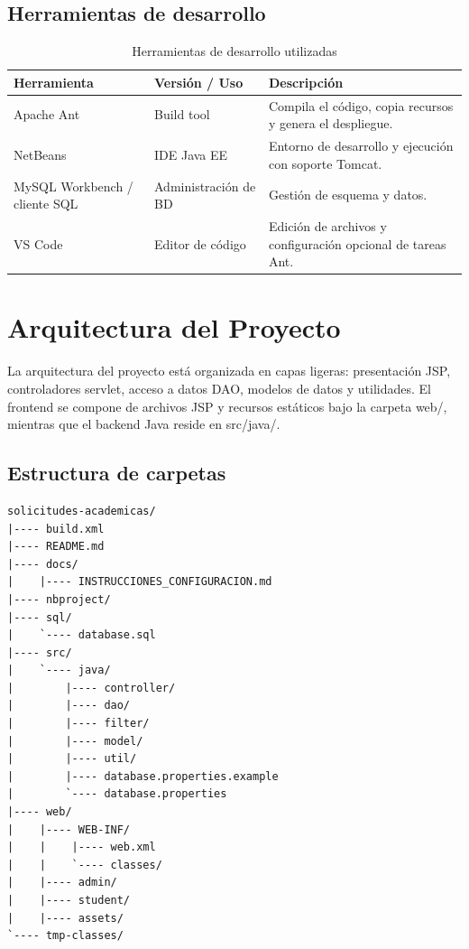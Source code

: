 \documentclass[12pt,letterpaper]{article}
\newcommand{\code}[1]{\texorpdfstring{\begingroup\normalfont\normalsize\def\_{\textunderscore\allowbreak}#1\endgroup}{#1}}
\begin{document}
\subsection{Herramientas de desarrollo}

\begin{longtable}{|p{}|p{}|p{}|}
\caption{Herramientas de desarrollo utilizadas}\\
\hline
\textbf{Herramienta} & \textbf{Versión / Uso} & \textbf{Descripción} \\
\hline
Apache Ant & Build tool & Compila el código, copia recursos y genera el despliegue. \\
\hline
NetBeans & IDE Java EE & Entorno de desarrollo y ejecución con soporte Tomcat. \\
\hline
MySQL Workbench / cliente SQL & Administración de BD & Gestión de esquema y datos. \\
\hline
VS Code & Editor de código & Edición de archivos y configuración opcional de tareas Ant. \\
\hline
\end{longtable}

\section{Arquitectura del Proyecto}

La arquitectura del proyecto está organizada en capas ligeras: presentación JSP, controladores servlet, acceso a datos DAO, modelos de datos y utilidades. El frontend se compone de archivos JSP y recursos estáticos bajo la carpeta \code{web/}, mientras que el backend Java reside en \code{src/java/}.

\subsection{Estructura de carpetas}

\begin{lstlisting}[language={}] 
solicitudes-academicas/
|---- build.xml
|---- README.md
|---- docs/
|    |---- INSTRUCCIONES_CONFIGURACION.md
|---- nbproject/
|---- sql/
|    `---- database.sql
|---- src/
|    `---- java/
|        |---- controller/
|        |---- dao/
|        |---- filter/
|        |---- model/
|        |---- util/
|        |---- database.properties.example
|        `---- database.properties
|---- web/
|    |---- WEB-INF/
|    |    |---- web.xml
|    |    `---- classes/
|    |---- admin/
|    |---- student/
|    |---- assets/
`---- tmp-classes/
\end{lstlisting}
\end{document}
